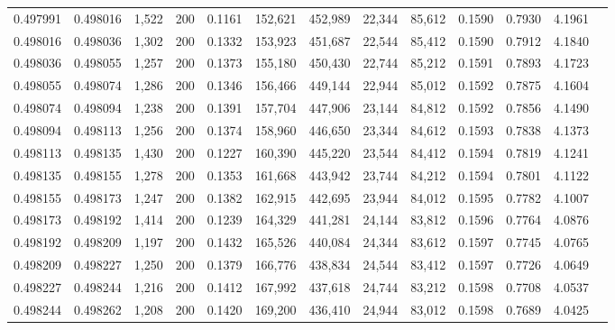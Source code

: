 \begin{tabular}{rrrrrrrrrrrrr}
0.497991 & 0.498016 & 1,522 & 200 &                                     0.1161 & 152,621 & 452,989 &  22,344 &  85,612 & 0.1590 & 0.7930 & 4.1961 \\
0.498016 & 0.498036 & 1,302 & 200 &                                     0.1332 & 153,923 & 451,687 &  22,544 &  85,412 & 0.1590 & 0.7912 & 4.1840 \\
0.498036 & 0.498055 & 1,257 & 200 &                                     0.1373 & 155,180 & 450,430 &  22,744 &  85,212 & 0.1591 & 0.7893 & 4.1723 \\
0.498055 & 0.498074 & 1,286 & 200 &                                     0.1346 & 156,466 & 449,144 &  22,944 &  85,012 & 0.1592 & 0.7875 & 4.1604 \\
0.498074 & 0.498094 & 1,238 & 200 &                                     0.1391 & 157,704 & 447,906 &  23,144 &  84,812 & 0.1592 & 0.7856 & 4.1490 \\
0.498094 & 0.498113 & 1,256 & 200 &                                     0.1374 & 158,960 & 446,650 &  23,344 &  84,612 & 0.1593 & 0.7838 & 4.1373 \\
0.498113 & 0.498135 & 1,430 & 200 &                                     0.1227 & 160,390 & 445,220 &  23,544 &  84,412 & 0.1594 & 0.7819 & 4.1241 \\
0.498135 & 0.498155 & 1,278 & 200 &                                     0.1353 & 161,668 & 443,942 &  23,744 &  84,212 & 0.1594 & 0.7801 & 4.1122 \\
0.498155 & 0.498173 & 1,247 & 200 &                                     0.1382 & 162,915 & 442,695 &  23,944 &  84,012 & 0.1595 & 0.7782 & 4.1007 \\
0.498173 & 0.498192 & 1,414 & 200 &                                     0.1239 & 164,329 & 441,281 &  24,144 &  83,812 & 0.1596 & 0.7764 & 4.0876 \\
0.498192 & 0.498209 & 1,197 & 200 &                                     0.1432 & 165,526 & 440,084 &  24,344 &  83,612 & 0.1597 & 0.7745 & 4.0765 \\
0.498209 & 0.498227 & 1,250 & 200 &                                     0.1379 & 166,776 & 438,834 &  24,544 &  83,412 & 0.1597 & 0.7726 & 4.0649 \\
0.498227 & 0.498244 & 1,216 & 200 &                                     0.1412 & 167,992 & 437,618 &  24,744 &  83,212 & 0.1598 & 0.7708 & 4.0537 \\
0.498244 & 0.498262 & 1,208 & 200 &                                     0.1420 & 169,200 & 436,410 &  24,944 &  83,012 & 0.1598 & 0.7689 & 4.0425 \\

\end{tabular}
